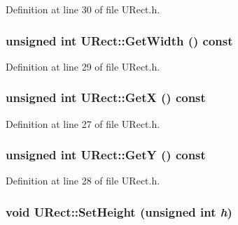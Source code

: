 Definition at line 30 of file URect.h.\hypertarget{class_u_rect_442168d8e32d90f4448e17d5c83ba7b0}{
\subsubsection[{GetWidth}]{\setlength{\rightskip}{0pt plus 5cm}unsigned int URect::GetWidth () const}}
\label{class_u_rect_442168d8e32d90f4448e17d5c83ba7b0}




Definition at line 29 of file URect.h.\hypertarget{class_u_rect_8509dfa3a2850160860dec1e3528b2f7}{
\subsubsection[{GetX}]{\setlength{\rightskip}{0pt plus 5cm}unsigned int URect::GetX () const}}
\label{class_u_rect_8509dfa3a2850160860dec1e3528b2f7}




Definition at line 27 of file URect.h.\hypertarget{class_u_rect_12b0ae4cd0102dacbcc2eb6edad73e47}{
\subsubsection[{GetY}]{\setlength{\rightskip}{0pt plus 5cm}unsigned int URect::GetY () const}}
\label{class_u_rect_12b0ae4cd0102dacbcc2eb6edad73e47}




Definition at line 28 of file URect.h.\hypertarget{class_u_rect_f15b083e8a87b92ee81b3776316464d6}{
\subsubsection[{SetHeight}]{\setlength{\rightskip}{0pt plus 5cm}void URect::SetHeight (unsigned int {\em h})}}
\label{class_u_rect_f15b083e8a87b92ee81b3776316464d6}




